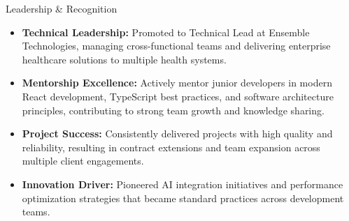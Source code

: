 \documentclass{resume} %
\begin{document}
\begin{rSection}{Leadership \& Recognition} 
\begin{itemize}
    \item \textbf{Technical Leadership:} Promoted to Technical Lead at Ensemble Technologies, managing cross-functional teams and delivering enterprise healthcare solutions to multiple health systems.
    \item \textbf{Mentorship Excellence:} Actively mentor junior developers in modern React development, TypeScript best practices, and software architecture principles, contributing to strong team growth and knowledge sharing.
    \item \textbf{Project Success:} Consistently delivered projects with high quality and reliability, resulting in contract extensions and team expansion across multiple client engagements.
    \item \textbf{Innovation Driver:} Pioneered AI integration initiatives and performance optimization strategies that became standard practices across development teams.
\end{itemize}

\end{rSection}
\end{document}
